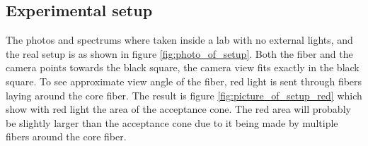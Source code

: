 
\subsection{Experimental setup}
The photos and spectrums where taken inside a lab with no external lights, and the real setup is as shown in figure \ref{fig:photo_of_setup}. Both the fiber and the camera points towards the black square, the camera view fits exactly in the black square. To see approximate view angle of the fiber, red light is sent through fibers laying around the core fiber. The result is figure \ref{fig:picture_of_setup_red} which show with red light the area of the acceptance cone. The red area will probably be slightly larger than the acceptance cone due to it being made by multiple fibers around the core fiber. 


